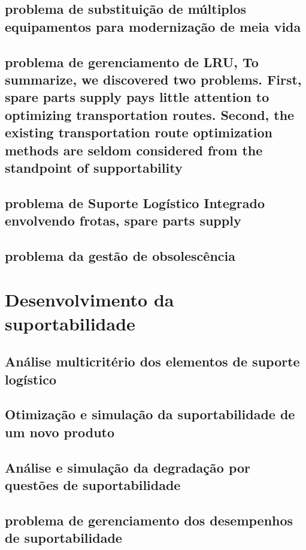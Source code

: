 \documentclass{article}
\begin{document}
\subsection{problema de substituição de múltiplos equipamentos para modernização de meia vida}

\subsection{problema de gerenciamento de LRU, To summarize, we discovered two problems. First, spare parts supply pays little attention to optimizing transportation routes. Second, the existing transportation route optimization methods are seldom considered from the standpoint of supportability}

\subsection{problema de Suporte Logístico Integrado envolvendo frotas, spare parts supply}

\subsection{problema da gestão de obsolescência}

\section{Desenvolvimento da suportabilidade}

\subsection{Análise multicritério dos elementos de suporte logístico}

\subsection{Otimização e simulação da suportabilidade de um novo produto}

\subsection{Análise e simulação da degradação por questões de suportabilidade}

\subsection{problema de gerenciamento dos desempenhos de suportabilidade}
\end{document}
